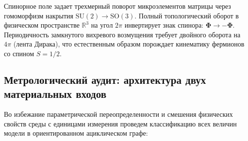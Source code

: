 \documentclass[11pt,a4paper]{article}
\theoremstyle{definition}
\theoremstyle{remark}
\begin{document}
Спинорное поле задает трехмерный поворот микроэлементов матрицы через гомоморфизм накрытия $\mathrm{SU}(2) \to \mathrm{SO}(3)$. Полный топологический оборот в физическом пространстве $\mathbb{R}^3$ на угол $2\pi$ инвертирует знак спинора: $\boldsymbol{\Phi} \to -\boldsymbol{\Phi}$. Периодичность замкнутого вихревого возмущения требует двойного оборота на $4\pi$ (лента Дирака), что естественным образом порождает кинематику фермионов со спином $S = 1/2$.
	
\subsection{Метрологический аудит: архитектура двух материальных входов}
	
Во избежание параметрической переопределенности и смешения физических свойств среды с единицами измерения проведем классификацию всех величин модели в ориентированном ациклическом графе:
	
\end{document}

